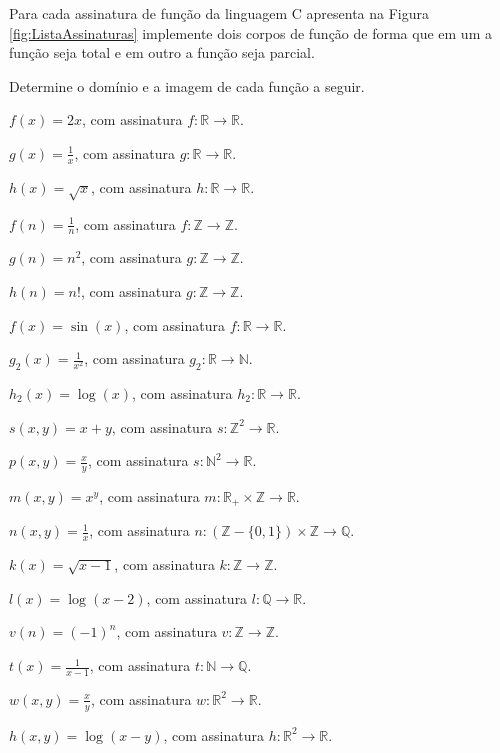 \begin{questao}\label{prob:Funcao2}
	Para cada assinatura de função da linguagem C apresenta na Figura \ref{fig:ListaAssinaturas} implemente dois corpos de função de forma que em um a função seja total e em outro a função seja parcial.
\end{questao}

\begin{questao}\label{prob:Funcao3}
	Determine o domínio e a imagem de cada função a seguir.
\end{questao}

\begin{exerList}
	\item $f(x) = 2x$, com assinatura $f: \mathbb{R} \rightarrow \mathbb{R}$.
	\item $g(x) = \displaystyle\frac{1}{x}$, com assinatura $g: \mathbb{R} \rightarrow \mathbb{R}$.
	\item $h(x) = \sqrt{x}$, com assinatura $h: \mathbb{R} \rightarrow \mathbb{R}$.
	\item $f(n) = \displaystyle\frac{1}{n}$,  com assinatura $f: \mathbb{Z} \rightarrow \mathbb{Z}$.
	\item $g(n) = n^2$,  com assinatura $g: \mathbb{Z} \rightarrow \mathbb{Z}$.
	\item $h(n) = n!$, com assinatura $g: \mathbb{Z} \rightarrow \mathbb{Z}$.
	\item $f(x) = \sin(x)$, com assinatura $f: \mathbb{R} \rightarrow \mathbb{R}$.
	\item $g_2(x) = \displaystyle\frac{1}{x^2}$, com assinatura $g_2: \mathbb{R} \rightarrow \mathbb{N}$.
	\item $h_2(x) = \log(x)$, com assinatura $h_2: \mathbb{R} \rightarrow \mathbb{R}$.
	\item $s(x, y) = x + y$, com assinatura $s: \mathbb{Z}^2 \rightarrow \mathbb{R}$.
	\item $p(x, y) = \displaystyle\frac{x}{y}$, com assinatura $s: \mathbb{N}^2 \rightarrow \mathbb{R}$.
	\item $m(x, y) = x^y$, com assinatura $m: \mathbb{R}_+ \times \mathbb{Z} \rightarrow \mathbb{R}$.
	\item $n(x, y) = \displaystyle\frac{1}{x}$,  com assinatura $n: (\mathbb{Z} - \{0,1\}) \times \mathbb{Z} \rightarrow \mathbb{Q}$.
	\item $k(x) = \sqrt{x - 1}$, com assinatura $k: \mathbb{Z} \rightarrow \mathbb{Z}$.
	\item $l(x) = \log(x - 2)$, com assinatura $l: \mathbb{Q} \rightarrow \mathbb{R}$.
	\item $v(n) = (-1)^n$,  com assinatura $v: \mathbb{Z} \rightarrow \mathbb{Z}$.
	\item $t(x) = \displaystyle\frac{1}{x - 1}$, com assinatura $t: \mathbb{N} \rightarrow \mathbb{Q}$.
	\item $w(x, y) = \displaystyle\frac{x}{y}$,  com assinatura $w: \mathbb{R}^2 \rightarrow \mathbb{R}$.
	\item $h(x, y) = \log(x - y)$, com assinatura $h: \mathbb{R}^2 \rightarrow \mathbb{R}$.
\end{exerList}

